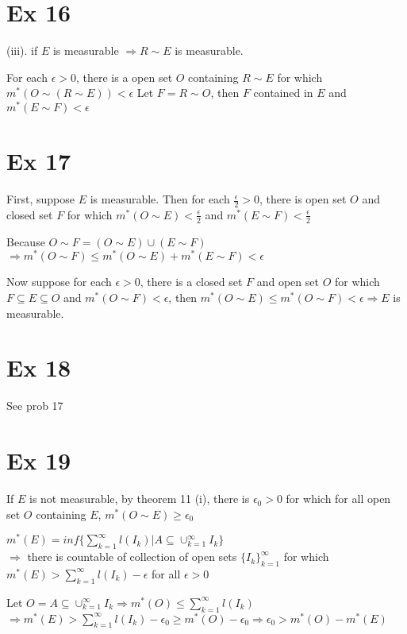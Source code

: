 \documentclass[24pt]{article}
\begin{document}
\section{Ex 16}
(iii). if $E$ is measurable $\Rightarrow R \sim E$ is measurable.

For each $\epsilon > 0$, there is a open set $O$ containing $R \sim E$ for which $m^*(O \sim (R \sim E)) < \epsilon$
Let $F = R \sim O$, then $F$ contained in $E$ and $m^*(E \sim F) < \epsilon$

\section{Ex 17}
First, suppose $E$ is measurable. Then for each $\frac{\epsilon}{2} > 0$, there is open set $O$ and closed set $F$ for which $m^*(O \sim E) < \frac{\epsilon}{2}$ and $m^*(E \sim F) < \frac{\epsilon}{2}$

Because $O \sim F = (O\sim E) \cup (E \sim F)$
$\Rightarrow m^*(O \sim F) \leq m^*(O \sim E) + m^*(E \sim F) < \epsilon$

Now suppose for each $\epsilon > 0$, there is a closed set $F$ and open set $O$ for which $F \subseteq E \subseteq O$ and $m^*(O \sim F) < \epsilon$, then $m^*(O \sim E) \leq m^*(O \sim F) < \epsilon \Rightarrow E$ is measurable.

\section{Ex 18}
See prob 17

\section{Ex 19}
If $E$ is not measurable, by theorem 11 (i), there is $\epsilon_0 > 0$ for which for all open set $O$ containing $E$, $m^*(O \sim E) \geq \epsilon_0$

$m^*(E) = inf\{\sum_{k=1}^{\infty}l(I_k) | A \subseteq \cup_{k = 1}^{\infty}I_k\}$\\
$ \Rightarrow$ there is countable of collection of open sets $\{I_k\}_{k=1}^{\infty}$ for which $m^*(E) > \sum_{k=1}^{\infty}l(I_k) - \epsilon$ for all $\epsilon > 0$

Let $O = A \subseteq \cup_{k = 1}^{\infty}I_k \Rightarrow m^*(O) \leq \sum_{k=1}^{\infty}l(I_k)$\\
$\Rightarrow m^*(E) > \sum_{k=1}^{\infty}l(I_k) - \epsilon_0 \geq m^*(O) - \epsilon_0 \Rightarrow \epsilon_0 > m^*(O) - m^*(E)$
\end{document}

